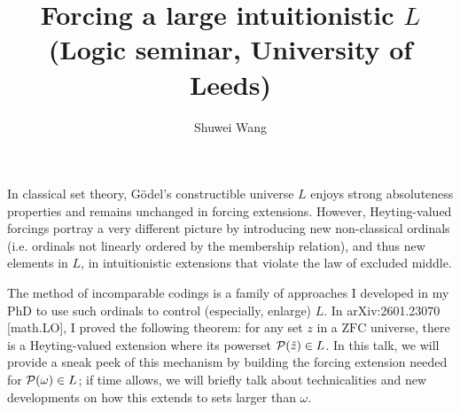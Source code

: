 \documentclass[11pt]{article}
\title{Forcing a large intuitionistic $L$ \\[6pt] \normalsize (Logic seminar, University of Leeds)}
\author{Shuwei Wang}
\date{\DTMdate{2026-04-29}}
\begin{document}
\maketitle

In classical set theory, G\"odel's constructible universe $L$ enjoys strong absoluteness properties and remains unchanged in forcing extensions. However, Heyting-valued forcings portray a very different picture by introducing new non-classical ordinals (i.e. ordinals not linearly ordered by the membership relation), and thus new elements in $L$, in intuitionistic extensions that violate the law of excluded middle.

The method of incomparable codings is a family of approaches I developed in my PhD to use such ordinals to control (especially, enlarge) $L$. In arXiv:2601.23070 [math.LO]\nocite{wang-sw26-plump}, I proved the following theorem: for any set $z$ in a $\mathrm{ZFC}$ universe, there is a Heyting-valued extension where its powerset $\mathcal{P}\mleft(\check{z}\mright) \in L$. In this talk, we will provide a sneak peek of this mechanism by building the forcing extension needed for $\mathcal{P}\mleft(\omega\mright) \in L$; if time allows, we will briefly talk about technicalities and new developments on how this extends to sets larger than $\omega$.

\bibmain
\end{document}
